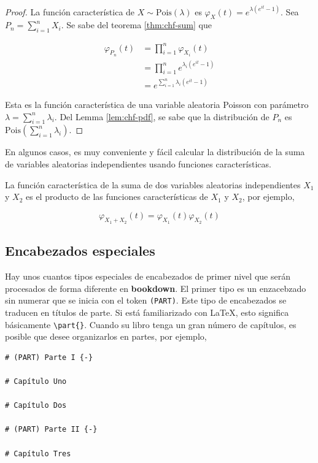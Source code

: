 \documentclass[12pt,]{krantz}
\theoremstyle{definition}
\theoremstyle{definition}
\theoremstyle{remark}
\let\BeginKnitrBlock\begin \let\EndKnitrBlock\end
\begin{document}
\BeginKnitrBlock{proof}
La función característica de
\(X\sim\mathrm{Pois}(\lambda)\) es
\(\varphi _{X}(t)=e^{\lambda (e^{it}-1)}\). Sea \(P_n=\sum_{i=1}^nX_i\).
Se sabe del teorema \ref{thm:chf-sum} que

\begin{equation*}
\begin{split}
\varphi _{P_{n}}(t) & =\prod_{i=1}^n\varphi _{X_i}(t) \\
& =\prod_{i=1}^n e^{\lambda_i (e^{it}-1)} \\
& = e^{\sum_{i=1}^n \lambda_i (e^{it}-1)}
\end{split}
\end{equation*}

Esta es la función característica de una variable aleatoria Poisson con
parámetro \(\lambda=\sum_{i=1}^n \lambda_i\). Del Lemma
\ref{lem:chf-pdf}, se sabe que la distribución de \(P_n\) es
\(\mathrm{Pois}(\sum_{i=1}^n\lambda_i)\).
\EndKnitrBlock{proof}

\BeginKnitrBlock{remark}
En algunos casos, es muy conveniente y
fácil calcular la distribución de la suma de variables aleatorias
independientes usando funciones características.
\EndKnitrBlock{remark}

\BeginKnitrBlock{corollary}
\protect\hypertarget{cor:unnamed-chunk-14}{}{\label{cor:unnamed-chunk-14}}La
función característica de la suma de dos variables aleatorias
independientes \(X_1\) y \(X_2\) es el producto de las funciones
características de \(X_1\) y \(X_2\), por ejemplo,

\[\varphi _{X_1+X_2}(t)=\varphi _{X_1}(t) \varphi _{X_2}(t)\]
\EndKnitrBlock{corollary}

\subsection{Encabezados especiales}\label{encabezados-especiales}

Hay unos cuantos tipos especiales de encabezados de primer nivel que
serán procesados de forma diferente en \textbf{bookdown}. El primer tipo
es un enzacebzado sin numerar que se inicia con el token
\texttt{(PART)}. Este tipo de encabezados se traducen en títulos de
parte. Si está familiarizado con LaTeX, esto significa
básicamente \texttt{\textbackslash{}part\{\}}. Cuando su libro tenga un
gran número de capítulos, es posible que desee organizarlos en partes,
por ejemplo,

\begin{verbatim}
# (PART) Parte I {-} 

# Capítulo Uno

# Capítulo Dos

# (PART) Parte II {-} 

# Capítulo Tres
\end{verbatim}
\end{document}
